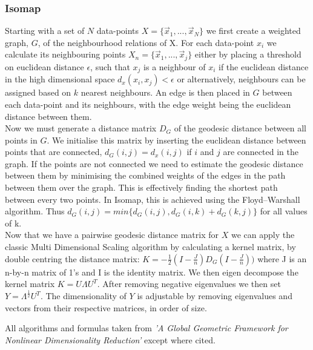\documentclass{article}
\begin{document}
\subsubsection{Isomap}
Starting with a set of $N$ data-points $X = \{\vec{x}_1,...,\vec{x}_N\}$ we first create a weighted graph, $G$, of the neighbourhood relations of X. For each data-point $x_i$ we calculate its neighbouring points $X_n = \{\vec{x}_1,...,\vec{x}_j\}$ either by placing a threshold on euclidean distance $\epsilon$, such that $x_j$ is a neighbour of $x_i$ if the euclidean distance in the high dimensional space $d_x(x_i,x_j) < \epsilon$ or alternatively, neighbours can be assigned based on $k$ nearest neighbours. An edge is then placed in $G$ between each data-point and its neighbours, with the edge weight being the euclidean distance between them. \\
Now we must generate a distance matrix $D_G$ of the geodesic distance between all points in $G$. We initialise this matrix by inserting the euclidean distance between points that are connected, $d_G(i,j) = d_x(i,j)$ if $i$ and $j$ are connected in the graph. If the points are not connected we need to estimate the geodesic distance between them by minimising the combined weights of the edges in the path between them over the graph. This is effectively finding the shortest path between every two points. In Isomap, this is achieved using the Floyd–Warshall algorithm.\cite{floyd1962algorithm} Thus $ d_G(i,j) = min\{d_G(i,j),d_G(i,k) + d_G(k,j)\}$ for all values of k. \\
Now that we have a pairwise geodesic distance matrix for $X$ we can apply the classic Multi Dimensional Scaling algorithm by calculating a kernel matrix, by double centring the distance matrix: $K = -\frac{1}{2}(I - \frac{J}{n})D_G(I-\frac{J}{n}))$ where J is an n-by-n matrix of 1's and I is the identity matrix. We then eigen decompose the kernel matrix $K = U\Lambda U^T$. After removing negative eigenvalues we then set $Y = \Lambda^{\frac{1}{2}}U^T$. The dimensionality of $Y$ is adjustable by removing eigenvalues and vectors from their respective matrices, in order of size.

All algorithms and formulas taken from \textit{'A Global Geometric Framework for Nonlinear Dimensionality Reduction'}\cite{tenenbaum2000global} except where cited.
\end{document}
